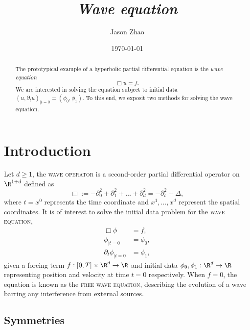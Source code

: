 \documentclass[reqno]{amsart}
\title
{
	\emph{Wave equation}
}
\author{Jason Zhao}
\date{\today}
\theoremstyle{definition}
\theoremstyle{remark}
\newcounter{problem}[section]	\declaretheorem[style=thmrecbox,name=Problem, numberlike=problem]{statement}
\renewcommand{\emph}{\textsc}
\begin{document}
\maketitle

\begin{abstract}
	The prototypical example of a hyperbolic partial differential equation is the \textit{wave equation}
		\[ \Box u = f. \]
	We are interested in solving the equation subject to initial data $(u, \partial_t u)_{|t = 0} = (\phi_0, \phi_1)$. 	To this end, we exposit two methods for solving the wave equation.
\end{abstract}

\tableofcontents

\section{Introduction}

Let $d \geq 1$, the \emph{wave operator} is a second-order partial differential operator on $\R^{1 + d}$ defined as
	\[ \Box := - \partial_0^2 + \partial_1^2 + \dots + \partial_d^2 = - \partial_t^2 + \Delta,  \]
where $t = x^0$ represents the time coordinate and $x^1, \dots, x^d$ represent the spatial coordinates. It is of interest to solve the initial data problem for the \emph{wave equation},
\begin{align*}
	\Box \phi
		&= f, \\
	\phi_{|t = 0}
		&= \phi_0, \\
	\partial_t \phi_{|t = 0}
		&= \phi_1,	
\end{align*}
given a forcing term $f : [0, T] \times \R^d \to \R$ and initial data $\phi_0, \phi_1 : \R^d \to \R$ representing position and velocity at time $t = 0$ respectively. When $f = 0$, the equation is known as the \emph{free wave equation}, describing the evolution of a wave barring any interference from external sources. 

\subsection{Symmetries}
\end{document}
